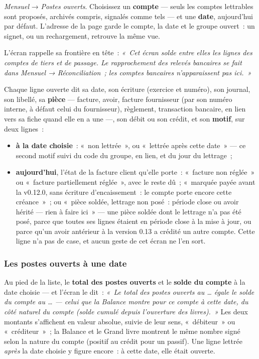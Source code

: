 \documentclass[a4paper,11pt,oneside]{article}
\begin{document}
\emph{Mensuel} → \emph{Postes ouverts}. Choisissez un \textbf{compte} --- seuls les comptes
lettrables sont proposés, archivés compris, signalés comme tels --- et une \textbf{date},
aujourd'hui par défaut. L'adresse de la page garde le compte, la date et le groupe ouvert~: un
signet, ou un rechargement, retrouve la même vue.

L'écran rappelle sa frontière en tête~: \emph{«~Cet écran solde entre elles les lignes des
comptes de tiers et de passage. Le rapprochement des relevés bancaires se fait dans Mensuel →
Réconciliation~; les comptes bancaires n'apparaissent pas ici.~»}

Chaque ligne ouverte dit sa date, son écriture (exercice et numéro), son journal, son libellé,
sa \textbf{pièce} --- facture, avoir, facture fournisseur (par son numéro interne, à défaut celui du fournisseur), règlement, transaction bancaire, en
lien vers sa fiche quand elle en a une ---, son débit ou son crédit, et son \textbf{motif}, sur
deux lignes~:

\begin{itemize}
    \item \textbf{à la date choisie}~: «~non lettrée~», ou «~lettrée après cette date~» --- ce
          second motif suivi du code du groupe, en lien, et du jour du lettrage~;
    \item \textbf{aujourd'hui}, l'état de la facture client qu'elle porte~: «~facture non
          réglée~» ou «~facture partiellement réglée~», avec le reste dû~; «~marquée payée avant
          la v0.12.0, sans écriture d'encaissement~: le compte porte encore cette créance~»~;
          ou «~pièce soldée, lettrage non posé~: période close ou avoir hérité --- rien à faire
          ici~» --- une pièce soldée dont le lettrage n'a pas été posé, parce que toutes ses
          lignes étaient en période close à la mise à jour, ou parce qu'un avoir antérieur à la
          version 0.13 a crédité un autre compte. Cette ligne n'a pas de case, et aucun geste de
          cet écran ne l'en sort.
\end{itemize}

\subsubsection{Les postes ouverts à une date}

Au pied de la liste, le \textbf{total des postes ouverts} et le \textbf{solde du compte} à la
date choisie --- et l'écran le dit~: \emph{«~Le total des postes ouverts au \ldots{} égale le
solde du compte au \ldots{} --- celui que la Balance montre pour ce compte à cette date, du côté
naturel du compte (solde cumulé depuis l'ouverture des livres).~»} Les deux montants
s'affichent en valeur absolue, suivie de leur sens, «~débiteur~» ou «~créditeur~»~; la Balance
et le Grand livre montrent le même nombre signé selon la nature du compte (positif au crédit
pour un passif). Une ligne lettrée \emph{après} la date choisie y figure encore~: à cette date,
elle était ouverte.
\end{document}
